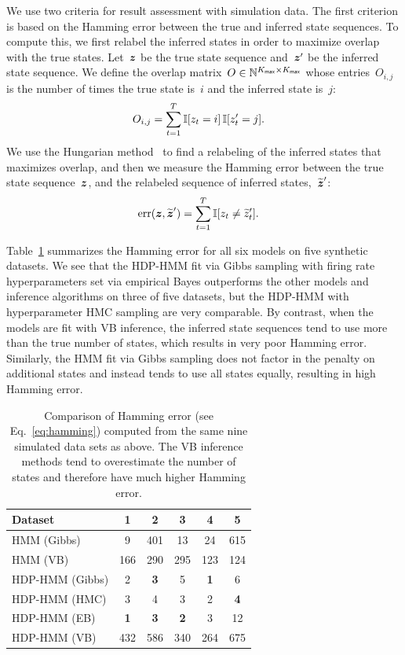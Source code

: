 We use two criteria for result assessment with simulation data.  The
first criterion is based on the Hamming error between the true and
inferred state sequences. To compute this, we first relabel the
inferred states in order to maximize overlap with the true
states. Let~$\boldsymbol{z}$ be the true state sequence
and~$\boldsymbol{z}'$ be the inferred state sequence. We define the
overlap matrix~$O \in \mathbb{N}^{K_{\mathsf{max}} \times K_{\mathsf{max}}}$ whose entries~$O_{i,j}$
is the number of times the true state is~$i$ and the inferred state
is~$j$:
\begin{align}
O_{i,j} &= \sum_{t=1}^T \mathbb{I}[z_t=i] \, \mathbb{I}[z'_t=j].
\end{align}
We use the Hungarian method~\citep{kuhn1955hungarian} to find a
relabeling of the inferred states that maximizes overlap, and then we
measure the Hamming error between the true state
sequence~$\boldsymbol{z}$, and the relabeled sequence of inferred
states,~$\widetilde{\boldsymbol{z}}'$:
\begin{align}
\label{eq:hamming}
\text{err}(\boldsymbol{z}, \widetilde{\boldsymbol{z}}') &= \sum_{t=1}^T \mathbb{I}[z_t \neq \widetilde{z}'_t].
\end{align}

Table~\ref{tab:synth_hamming} summarizes the Hamming error for all six
models on five synthetic datasets. We see that the HDP-HMM fit via
Gibbs sampling with firing rate hyperparameters set via empirical
Bayes outperforms the other models and inference algorithms on three
of five datasets, but the HDP-HMM with hyperparameter HMC sampling are
very comparable. By contrast, when the models are fit with VB
inference, the inferred state sequences tend to use more than the true
number of states, which results in very poor Hamming error. Similarly,
the HMM fit via Gibbs sampling does not factor in the penalty on
additional states and instead tends to use all states equally,
resulting in high Hamming error.

\begin{table}
  \centering
  \caption[Comparison of Hamming error on synthetic data]{Comparison
    of Hamming error (see Eq.~\ref{eq:hamming}) computed from the same
    nine simulated data sets as above. The VB inference methods tend
    to overestimate the number of states and therefore have much
    higher Hamming error.}
  \begin{tabular}{l|ccccc}
    Dataset & 1 & 2 & 3 & 4 & 5 \\
    \hline
    HMM (Gibbs) & 9 & 401 & 13 & 24 & 615 \\
    HMM (VB) & 166 & 290 & 295 & 123 & 124 \\
    HDP-HMM (Gibbs) & 2 & \bf{3} & 5 & \bf{1} & 6 \\
    HDP-HMM (HMC) & 3 & 4 & 3 & 2 & \bf{4} \\
    HDP-HMM (EB) & \bf{1} & \bf{3} & \bf{2} & 3 & 12 \\ 
    HDP-HMM (VB) & 432 & 586 & 340 & 264 & 675 \\
    \hline
  \end{tabular}
  \label{tab:synth_hamming}
\end{table}

